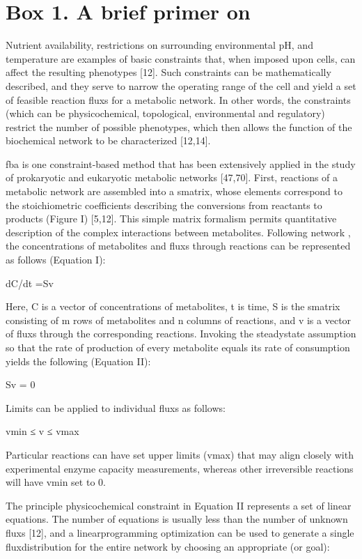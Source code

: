 \section{Box 1. A brief primer on }
Nutrient availability, restrictions on surrounding 
environmental pH, and temperature are examples of basic 
constraints that, when imposed upon cells, can affect 
the resulting phenotypes [12]. Such constraints can 
be mathematically described, and they serve to narrow 
the operating range of the cell and yield a set of feasible 
reaction \glspl{flux} for a metabolic network. In other words, 
the constraints (which can be physicochemical, 
topological, environmental and regulatory) restrict 
the number of possible phenotypes, which then allows 
the function of the biochemical network to be 
characterized [12,14].

\gls{fba} is one constraint-based 
method that has been extensively applied in the study 
of prokaryotic and eukaryotic metabolic networks [47,70]. 
First, reactions of a metabolic network are assembled 
into a \gls{smatrix}, whose elements 
correspond to the stoichiometric coefficients describing 
the conversions from reactants to products (Figure I) [5,12]. 
This simple matrix formalism permits quantitative 
description of the complex interactions between metabolites. 
Following network , the concentrations of 
metabolites and \glspl{flux} through reactions can be represented 
as follows (Equation I):

dC/dt =Sv

Here, C is a vector of concentrations of metabolites, t is 
time, S is the \gls{smatrix} consisting of m rows 
of metabolites and n columns of reactions, and v is a 
vector of \glspl{flux} through the corresponding reactions. 
Invoking the \gls{steadystate} assumption so that the rate 
of production of every metabolite equals its rate of 
consumption yields the following (Equation II):

Sv = 0

Limits can be applied to individual \glspl{flux} as follows:

vmin ≤ v ≤ vmax

Particular reactions can have set upper limits (vmax) that 
may align closely with experimental enzyme capacity measurements, 
whereas other irreversible reactions will have vmin set to 0.

The principle physicochemical constraint in Equation II 
represents a set of linear equations. The number of 
equations is usually less than the number of unknown 
\glspl{flux} [12], and a \gls{linearprogramming} optimization can be 
used to generate a single \gls{fluxdistribution} for the entire 
network by choosing an appropriate  (or goal): 

